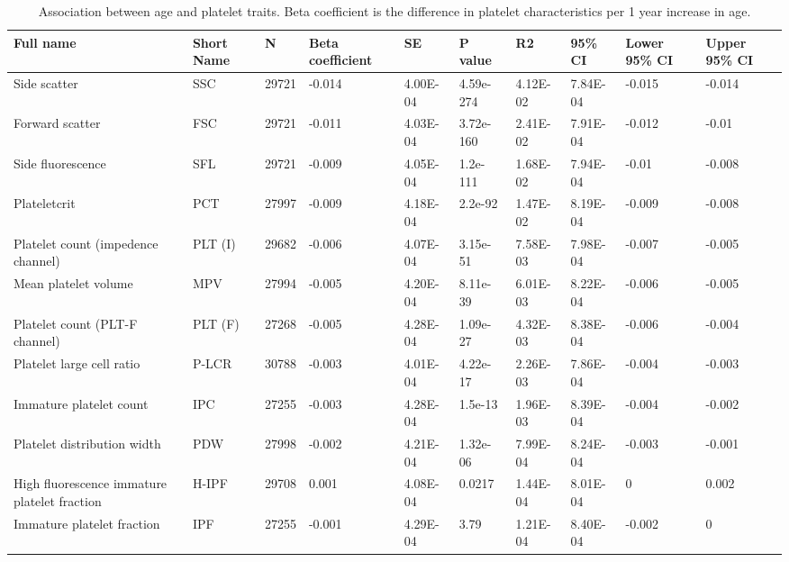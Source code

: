 \documentclass[11pt,twoside]{bristolthesis}
\begin{document}
\begin{landscape}\begin{table}

\caption[Association between age and platelet traits]{\label{tab:age-platelets}Association between age and platelet traits. Βeta coefficient is the difference in platelet characteristics per 1 year increase in age.}
\centering
\begin{tabu} to 
\toprule
Full name & Short Name & N & Βeta coefficient & SE & P value & R2 & 95\% CI & Lower 95\% CI & Upper 95\% CI\\
\midrule
Side scatter & SSC & 29721 & -0.014 & 4.00E-04 & 4.59e-274 & 4.12E-02 & 7.84E-04 & -0.015 & -0.014\\
Forward scatter & FSC & 29721 & -0.011 & 4.03E-04 & 3.72e-160 & 2.41E-02 & 7.91E-04 & -0.012 & -0.01\\
Side fluorescence & SFL & 29721 & -0.009 & 4.05E-04 & 1.2e-111 & 1.68E-02 & 7.94E-04 & -0.01 & -0.008\\
Plateletcrit & PCT & 27997 & -0.009 & 4.18E-04 & 2.2e-92 & 1.47E-02 & 8.19E-04 & -0.009 & -0.008\\
Platelet count (impedence channel) & PLT (I) & 29682 & -0.006 & 4.07E-04 & 3.15e-51 & 7.58E-03 & 7.98E-04 & -0.007 & -0.005\\
\addlinespace
Mean platelet volume & MPV & 27994 & -0.005 & 4.20E-04 & 8.11e-39 & 6.01E-03 & 8.22E-04 & -0.006 & -0.005\\
Platelet count (PLT-F channel) & PLT (F) & 27268 & -0.005 & 4.28E-04 & 1.09e-27 & 4.32E-03 & 8.38E-04 & -0.006 & -0.004\\
Platelet large cell ratio & P-LCR & 30788 & -0.003 & 4.01E-04 & 4.22e-17 & 2.26E-03 & 7.86E-04 & -0.004 & -0.003\\
Immature platelet count & IPC & 27255 & -0.003 & 4.28E-04 & 1.5e-13 & 1.96E-03 & 8.39E-04 & -0.004 & -0.002\\
Platelet distribution width & PDW & 27998 & -0.002 & 4.21E-04 & 1.32e-06 & 7.99E-04 & 8.24E-04 & -0.003 & -0.001\\
\addlinespace
High fluorescence immature platelet fraction & H-IPF & 29708 & 0.001 & 4.08E-04 & 0.0217 & 1.44E-04 & 8.01E-04 & 0 & 0.002\\
Immature platelet fraction & IPF & 27255 & -0.001 & 4.29E-04 & 3.79 & 1.21E-04 & 8.40E-04 & -0.002 & 0\\
\bottomrule
\end{tabu}
\end{table}
\end{landscape}
\end{document}
